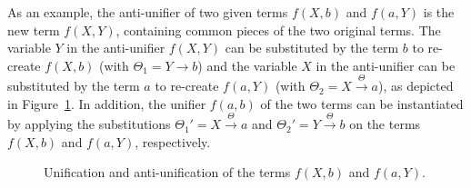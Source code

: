 As an example, the anti-unifier of two given terms $f(X,b)$ and $f(a,Y)$ is the new term $f(X,Y)$, containing common pieces of the two original terms. The variable $Y$ in the anti-unifier $f(X,Y)$ can be substituted by the term $b$ to re-create $f(X,b)$ (with $\Theta_1 = Y\xrightarrow{}b$) and the variable $X$ in the anti-unifier can be substituted by the term $a$ to re-create $f(a,Y)$
(with $\Theta_2 = X\xrightarrow{\Theta}a$), as depicted in Figure~\ref{fig:uni-anti-uni}.
In addition, the unifier $f(a,b)$ of the two terms can be instantiated by applying the substitutions $\Theta_1'=X\xrightarrow{\Theta}a$ and $\Theta_2'=Y\xrightarrow{\Theta}b$ on the terms $f(X,b)$ and $f(a,Y)$, respectively.

\begin{figure} [t]
\centering{}
  \caption{Unification and anti-unification of the terms $f(X,b)$ and $f(a,Y)$.}
  \label{fig:uni-anti-uni}
\end{figure}


